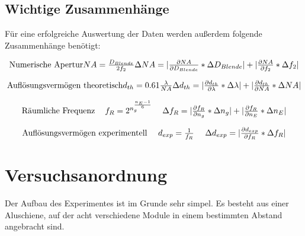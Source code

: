 \documentclass[12pt,a4paper,twoside]{article}
\begin{document}
\subsection{Wichtige Zusammenhänge}

Für eine erfolgreiche Auswertung der Daten werden außerdem folgende Zusammenhänge benötigt:

\begin{equation}
    \label{eq:WZ-NA}
    \centerline{Numerische Apertur \\ $NA = \frac{D_{Blende}}{2f_{2}}$ \\ $\Delta NA = \vert \frac{\partial NA}{\partial D_{Blende}} * \Delta D_{Blende} \vert + \vert \frac{\partial NA}{\partial f_{2}} * \Delta f_{2} \vert $}
\end{equation}

\begin{equation}
    \label{eq:WZ-dTheo}
    \centerline{Auflösungsvermögen theoretisch \\ $d_{th} = 0.61\frac{\lambda}{NA}$ \\ $\Delta d_{th} = \vert \frac{\partial d_{th}}{\partial \lambda} * \Delta \lambda \vert + \vert \frac{\partial d_{th}}{\partial NA} * \Delta NA \vert $}
\end{equation}

\begin{equation}
    \label{eq:WZ-fr}
    \centerline{Räumliche Frequenz \\ $f_{R} = 2^{n_{g}^{\frac{n_{E}-1}{6}}}$ \\ $\Delta f_{R} = \vert \frac{\partial f_{R}}{\partial n_{g}} * \Delta n_{g} \vert + \vert \frac{\partial f_{R}}{\partial n_{E}} * \Delta n_{E} \vert $}
\end{equation}

\begin{equation}
    \label{eq:WZ-dExp}
    \centerline{Auflösungsvermögen experimentell \\ $d_{exp} = \frac{1}{f_{R}}$ \\ $\Delta d_{exp} = \vert \frac{\partial d_{exp}}{\partial f_{R}} * \Delta f_{R} \vert$}
\end{equation}


    

\section{Versuchsanordnung} %

Der Aufbau des Experimentes ist im Grunde sehr simpel. Es besteht aus einer Aluschiene, auf der acht verschiedene Module in einem bestimmten Abstand angebracht sind. 
\end{document}
